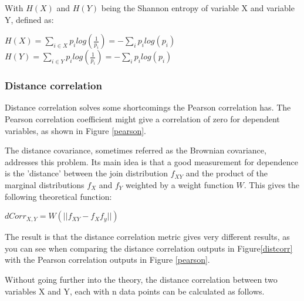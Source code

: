 With $H(X)$ and $H(Y)$ being the Shannon entropy of variable X and variable Y, defined as:

\begin{center}
$H(X) = \sum\limits_{i\in X} p_ilog(\frac{1}{p_i}) = - \sum\limits_i p_ilog(p_i)$\\
$H(Y) = \sum\limits_{i\in Y} p_ilog(\frac{1}{p_i}) = - \sum\limits_i p_ilog(p_i)$

\end{center}

\clearpage

\subsubsection{Distance correlation}
Distance correlation solves some shortcomings the Pearson correlation has. The Pearson correlation coefficient might give a correlation of zero for dependent variables, as shown in Figure \ref{pearson}.


The distance covariance, sometimes referred as the Brownian covariance, addresses this problem\citep{distPaper}. Its main idea is that a good measurement for dependence is the 'distance' between the join distribution $f_{XY}$ and the product of the marginal distributions $f_X$ and $f_Y$ weighted by a weight function $W$. This gives the following theoretical function:

\begin{center}
$dCorr_{X,Y} = W( || f_{XY} - f_Xf_y|| )$
\end{center}

The result is that the distance correlation metric gives very different results, as you can see when comparing the distance correlation outputs in Figure\ref{distcorr} with the Pearson correlation outputs in Figure \ref{pearson}.


Without going further into the theory, the distance correlation between two variables X and Y, each with n data points can be calculated as 
follows. 

\npar

